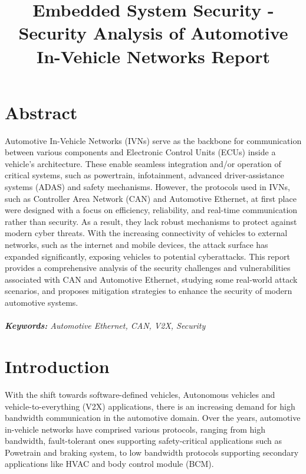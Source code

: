 \documentclass{report}
\title{Embedded System Security - Security Analysis of  Automotive In-Vehicle Networks Report} %
\begin{document}

\subject{Embedded System Security} %




\buildmargins %
\buildcover %
\toc %


\section{Abstract}
Automotive In-Vehicle Networks (IVNs) serve as the backbone for communication between various components and Electronic Control Units (ECUs) inside a vehicle's architecture. These enable seamless integration and/or operation of critical systems, such as powertrain, infotainment, advanced driver-assistance systems (ADAS) and safety mechanisms. However, the protocols used in IVNs, such as Controller Area Network (CAN) and Automotive Ethernet, at first place were designed with a focus on efficiency, reliability, and real-time communication rather than security. As a result, they lack robust mechanisms to protect against modern cyber threats. With the increasing connectivity of vehicles to external networks, such as the internet and mobile devices, the attack surface has expanded significantly, exposing vehicles to potential cyberattacks. This report provides a comprehensive analysis of the security challenges and vulnerabilities associated with CAN and Automotive Ethernet, studying some real-world attack scenarios, and proposes mitigation strategies to enhance the security of modern automotive systems.
\\
\\
\emph{\textbf{Keywords:} Automotive Ethernet, CAN, V2X, Security}

\section{Introduction}
With the shift towards software-defined vehicles, Autonomous vehicles and vehicle-to-everything (V2X) applications, there is an increasing demand for high bandwidth communication in the automotive domain. Over the years, automotive in-vehicle networks have comprised various protocols, ranging from high bandwidth, fault-tolerant ones supporting safety-critical applications such as Powetrain and braking system,  to low bandwidth protocols supporting secondary applications like HVAC and body control module (BCM).
\end{document}
